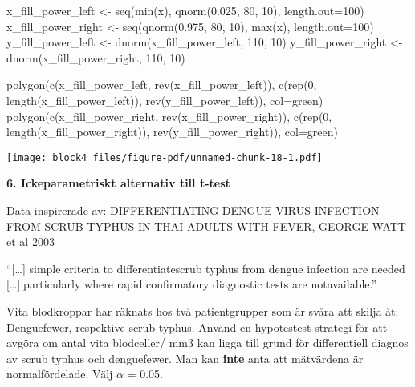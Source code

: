 \documentclass[
  letterpaper,
  DIV=11,
  numbers=noendperiod]{scrartcl}
\newenvironment{Shaded}{\begin{snugshade}}{\end{snugshade}}
\newcommand{\AttributeTok}[1]{\textcolor[rgb]{0.40,0.45,0.13}{#1}}
\newcommand{\DecValTok}[1]{\textcolor[rgb]{0.68,0.00,0.00}{#1}}
\newcommand{\FloatTok}[1]{\textcolor[rgb]{0.68,0.00,0.00}{#1}}
\newcommand{\FunctionTok}[1]{\textcolor[rgb]{0.28,0.35,0.67}{#1}}
\newcommand{\NormalTok}[1]{\textcolor[rgb]{0.00,0.23,0.31}{#1}}
\newcommand{\OtherTok}[1]{\textcolor[rgb]{0.00,0.23,0.31}{#1}}
\newcommand{\StringTok}[1]{\textcolor[rgb]{0.13,0.47,0.30}{#1}}
\begin{document}
\begin{Shaded}
\begin{Highlighting}[]
\NormalTok{x\_fill\_power\_left }\OtherTok{\textless{}{-}} \FunctionTok{seq}\NormalTok{(}\FunctionTok{min}\NormalTok{(x), }\FunctionTok{qnorm}\NormalTok{(}\FloatTok{0.025}\NormalTok{, }\DecValTok{80}\NormalTok{, }\DecValTok{10}\NormalTok{), }\AttributeTok{length.out=}\DecValTok{100}\NormalTok{)}
\NormalTok{x\_fill\_power\_right }\OtherTok{\textless{}{-}} \FunctionTok{seq}\NormalTok{(}\FunctionTok{qnorm}\NormalTok{(}\FloatTok{0.975}\NormalTok{, }\DecValTok{80}\NormalTok{, }\DecValTok{10}\NormalTok{), }\FunctionTok{max}\NormalTok{(x), }\AttributeTok{length.out=}\DecValTok{100}\NormalTok{)}
\NormalTok{y\_fill\_power\_left }\OtherTok{\textless{}{-}} \FunctionTok{dnorm}\NormalTok{(x\_fill\_power\_left, }\DecValTok{110}\NormalTok{, }\DecValTok{10}\NormalTok{)}
\NormalTok{y\_fill\_power\_right }\OtherTok{\textless{}{-}} \FunctionTok{dnorm}\NormalTok{(x\_fill\_power\_right, }\DecValTok{110}\NormalTok{, }\DecValTok{10}\NormalTok{)}

\FunctionTok{polygon}\NormalTok{(}\FunctionTok{c}\NormalTok{(x\_fill\_power\_left, }\FunctionTok{rev}\NormalTok{(x\_fill\_power\_left)),}
\FunctionTok{c}\NormalTok{(}\FunctionTok{rep}\NormalTok{(}\DecValTok{0}\NormalTok{, }\FunctionTok{length}\NormalTok{(x\_fill\_power\_left)), }\FunctionTok{rev}\NormalTok{(y\_fill\_power\_left)), }\AttributeTok{col=}\StringTok{\textquotesingle{}green\textquotesingle{}}\NormalTok{)}
\FunctionTok{polygon}\NormalTok{(}\FunctionTok{c}\NormalTok{(x\_fill\_power\_right, }\FunctionTok{rev}\NormalTok{(x\_fill\_power\_right)),}
\FunctionTok{c}\NormalTok{(}\FunctionTok{rep}\NormalTok{(}\DecValTok{0}\NormalTok{, }\FunctionTok{length}\NormalTok{(x\_fill\_power\_right)), }\FunctionTok{rev}\NormalTok{(y\_fill\_power\_right)), }\AttributeTok{col=}\StringTok{\textquotesingle{}green\textquotesingle{}}\NormalTok{)}
\end{Highlighting}
\end{Shaded}

\texttt{[image: block4\_files/figure-pdf/unnamed-chunk-18-1.pdf]}

\textbf{6. Ickeparametriskt alternativ till t-test}

Data inspirerade av: DIFFERENTIATING DENGUE VIRUS INFECTION FROM SCRUB
TYPHUS IN THAI ADULTS WITH FEVER, GEORGE WATT et al 2003

``{[}\ldots{]} simple criteria to differentiatescrub typhus from dengue
infection are needed {[}\ldots{]},particularly where rapid confirmatory
diagnostic tests are notavailable.''

Vita blodkroppar har räknats hos två patientgrupper som är svåra att
skilja åt: Denguefewer, respektive scrub typhus. Använd en
hypotestest-strategi för att avgöra om antal vita blodceller/ mm3 kan
ligga till grund för differentiell diagnos av scrub typhus och
denguefewer. Man kan \textbf{inte} anta att mätvärdena är
normalfördelade. Välj \(α\) = 0.05.
\end{document}
